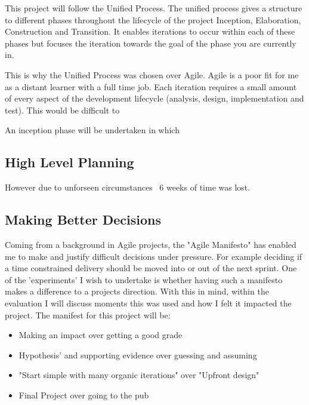 This project will follow the Unified Process. The unified process gives a
structure to different phases throughout the lifecycle of the project
Inception, Elaboration, Construction and Transition. It enables iterations
to occur within each of these phases but focuses the iteration towards the
goal of the phase you are currently in.

 This is why the Unified Process was chosen over Agile. Agile is a poor fit for
  me as a distant learner with a full time job. Each iteration requires a
  small amount of every aspect of the development lifecycle (analysis,
  design, implementation and test). This would be difficult to



An inception phase will be
undertaken in which

\subsection{High Level Planning}


However
due to unforseen circumstances ~6 weeks of time was lost.

\subsection{Making Better Decisions}
Coming from a background in Agile projects, the "Agile Manifesto" has enabled
me to make and justify difficult decisions under pressure. For example deciding
 if a time constrained delivery should be moved into or out of the next
 sprint. One of the 'experiments' I wish to undertake is whether having such a
 manifesto makes a difference to a projects direction. With this in mind,
 within the evaluation I will discuss moments this was used and how I felt
 it impacted the project. The manifest for this project will be:
\begin{itemize}
  \item Making an impact over getting a good grade
  \item Hypothesis’ and supporting evidence over guessing and assuming
  \item "Start simple with many organic iterations" over "Upfront design"
  \item Final Project over going to the pub
\end{itemize}

